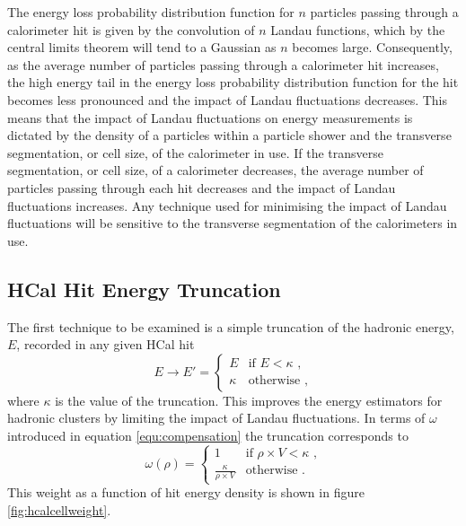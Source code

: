 The energy loss probability distribution function for $n$ particles passing through a calorimeter hit is given by the convolution of $n$ Landau functions, which by the central limits theorem will tend to a Gaussian as $n$ becomes large.  Consequently, as the average number of particles passing through a calorimeter hit increases, the high energy tail in the energy loss probability distribution function for the hit becomes less pronounced and the impact of Landau fluctuations decreases.  This means that the impact of Landau fluctuations on energy measurements is dictated by the density of a particles within a particle shower and the transverse segmentation, or cell size, of the calorimeter in use.  If the transverse segmentation, or cell size, of a calorimeter decreases, the average number of particles passing through each hit decreases and the impact of Landau fluctuations increases.  Any technique used for minimising the impact of Landau fluctuations will be sensitive to the transverse segmentation of the calorimeters in use.  


\subsection{HCal Hit Energy Truncation}
\label{sec:hcalcelltruncation}
The first technique to be examined is a simple truncation of the hadronic energy, $E$, recorded in any given HCal hit
%
\begin{equation}
E \rightarrow E' =
\begin{cases}
E & \text{if } E < \kappa \text{ ,} \\
\kappa & \text{otherwise} \text{ ,}
\end{cases}
\end{equation}
%
\noindent where $\kappa$ is the value of the truncation.  This improves the energy estimators for hadronic clusters by limiting the impact of Landau fluctuations.  In terms of $\omega$ introduced in equation \ref{equ:compensation} the truncation corresponds to
%
\begin{equation}
\omega(\rho) =
\begin{cases}
1 & \text{if } \rho \times V < \kappa \text{ ,} \\
\frac{\kappa}{\rho \times V} & \text{otherwise} \text{ .}
\end{cases}
\end{equation}
%
\noindent This weight as a function of hit energy density is shown in figure \ref{fig:hcalcellweight}.  

